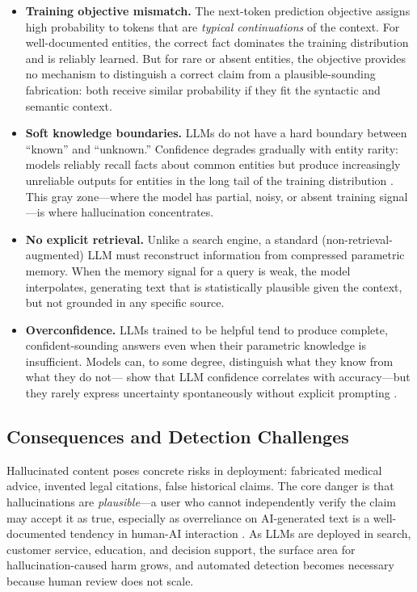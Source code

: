 \begin{itemize}
    \item \textbf{Training objective mismatch.} The next-token prediction objective assigns high probability to tokens that are \emph{typical continuations} of the context. For well-documented entities, the correct fact dominates the training distribution and is reliably learned. But for rare or absent entities, the objective provides no mechanism to distinguish a correct claim from a plausible-sounding fabrication: both receive similar probability if they fit the syntactic and semantic context.

    \item \textbf{Soft knowledge boundaries.} LLMs do not have a hard boundary between ``known'' and ``unknown.'' Confidence degrades gradually with entity rarity: models reliably recall facts about common entities but produce increasingly unreliable outputs for entities in the long tail of the training distribution \citep{sun2024entity, kandpal2023large}. This gray zone---where the model has partial, noisy, or absent training signal---is where hallucination concentrates.

    \item \textbf{No explicit retrieval.} Unlike a search engine, a standard (non-retrieval-augmented) LLM must reconstruct information from compressed parametric memory. When the memory signal for a query is weak, the model interpolates, generating text that is statistically plausible given the context, but not grounded in any specific source.

    \item \textbf{Overconfidence.} LLMs trained to be helpful tend to produce complete, confident-sounding answers even when their parametric knowledge is insufficient. Models can, to some degree, distinguish what they know from what they do not---\citet{kadavath2022language} show that LLM confidence correlates with accuracy---but they rarely express uncertainty spontaneously without explicit prompting \citep{yin2023large}.
\end{itemize}

\subsection{Consequences and Detection Challenges}
\label{sec:bg-halluc-consequences}

Hallucinated content poses concrete risks in deployment: fabricated medical advice, invented legal citations, false historical claims. The core danger is that hallucinations are \emph{plausible}---a user who cannot independently verify the claim may accept it as true, especially as overreliance on AI-generated text is a well-documented tendency in human-AI interaction \citep{passi2022overreliance}. As LLMs are deployed in search, customer service, education, and decision support, the surface area for hallucination-caused harm grows, and automated detection becomes necessary because human review does not scale.

